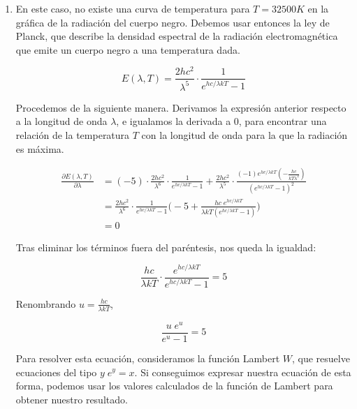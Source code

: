 \begin{enumerate}
    \vspace{20px}
    \item En este caso, no existe una curva de temperatura para $T = 32 500 K$ en la gráfica de la radiación del cuerpo negro.
    Debemos usar entonces la ley de Planck, que describe
    la densidad espectral de la radiación electromagnética que emite un cuerpo negro a una temperatura dada.

    \begin{equation*}
        E(\lambda, T) = \frac{2hc^2}{\lambda^5} \cdot \frac{1}{e^{hc/\lambda k T} - 1}
    \end{equation*}

    Procedemos de la siguiente manera. Derivamos la expresión anterior respecto a la longitud de onda $\lambda$, e igualamos
    la derivada a 0, para encontrar una relación de la temperatura $T$ con la longitud de onda para la que la radiación es
    máxima.

    \begin{align*}
        \frac{\partial E(\lambda, T)}{\partial \lambda}  &= (-5) \cdot \frac{2hc^2}{\lambda^6} \cdot \frac{1}{e^{hc/\lambda k T} - 1}
        + \frac{2hc^2}{\lambda^5} \cdot
        \frac{(-1) e^{hc/\lambda k T} (- \frac{hc}{k T \lambda^2})}{(e^{hc/\lambda k T} - 1)^2} \\
        &= \frac{2hc^2}{\lambda^6} \cdot \frac{1}{e^{hc/\lambda k T} - 1}
        \biggl( -5 + \frac{hc\;e^{hc/\lambda k T}}{\lambda k T  (e^{hc/\lambda k T} - 1)} \biggr) \\
        &= 0
    \end{align*}

    Tras eliminar los términos fuera del paréntesis, nos queda la igualdad:

    \begin{equation*}
        \frac{hc}{\lambda k T} \cdot \frac{e^{hc/\lambda k T}}{e^{hc/\lambda k T} - 1} = 5
    \end{equation*}

    Renombrando $u = \frac{hc}{\lambda k T}$,

    \begin{equation*}
        \frac{u\; e^u}{e^u -1} = 5
    \end{equation*}

    Para resolver esta ecuación, consideramos la función Lambert $W$, que resuelve ecuaciones del tipo ${y\;e^{y}=x}$.
    Si conseguimos expresar nuestra ecuación de esta forma, podemos usar los valores calculados de la función de Lambert
    para obtener nuestro resultado.


\end{enumerate}
